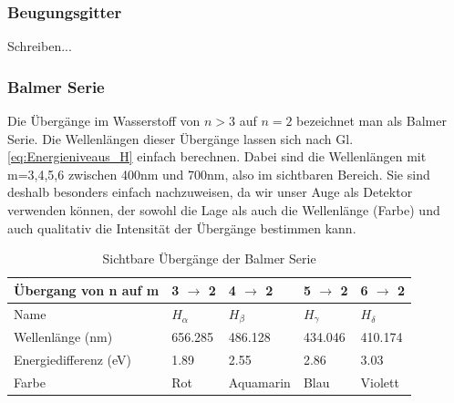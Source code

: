 \documentclass[]{article}
\begin{document}
\subsubsection{Beugungsgitter}
Schreiben...
\subsubsection{Balmer Serie}
Die Übergänge im Wasserstoff von $n>3$ auf $n=2$ bezeichnet man als Balmer Serie. Die Wellenlängen dieser Übergänge lassen sich nach Gl. \ref{eq:Energieniveaus_H} einfach berechnen. Dabei sind die Wellenlängen mit m=3,4,5,6 zwischen 400nm und 700nm, also im sichtbaren Bereich. Sie sind deshalb besonders einfach nachzuweisen, da wir unser Auge als Detektor verwenden können, der sowohl die Lage als auch die Wellenlänge (Farbe) und auch qualitativ die Intensität der Übergänge bestimmen kann.
\begin{table}[!ht]
	\centering
	\caption{Sichtbare Übergänge der Balmer Serie}
	\label{my-label}
	\begin{tabular}{|l|l|l|l|l|}
		\hline
		Übergang von n auf m  & 3 $\rightarrow$  2 & 4 $\rightarrow$ 2 & 5 $\rightarrow$ 2 & 6 $  \rightarrow$ 2 \\ \hline
		Name                  & $H_{\alpha }$      & $H_{\beta}$        & $H_{\gamma }$      & $H_{\delta}$       \\ \hline
		Wellenlänge (nm)      & 656.285                      & 486.128                      & 434.046                       & 410.174                        \\ \hline
		Energiedifferenz (eV) & 1.89                           & 2.55                           & 2.86                           & 3.03                           \\ \hline
		Farbe                 & Rot                            & Aquamarin                      & Blau                           & Violett                        \\ \hline

	\end{tabular}
\end{table}
\end{document}
